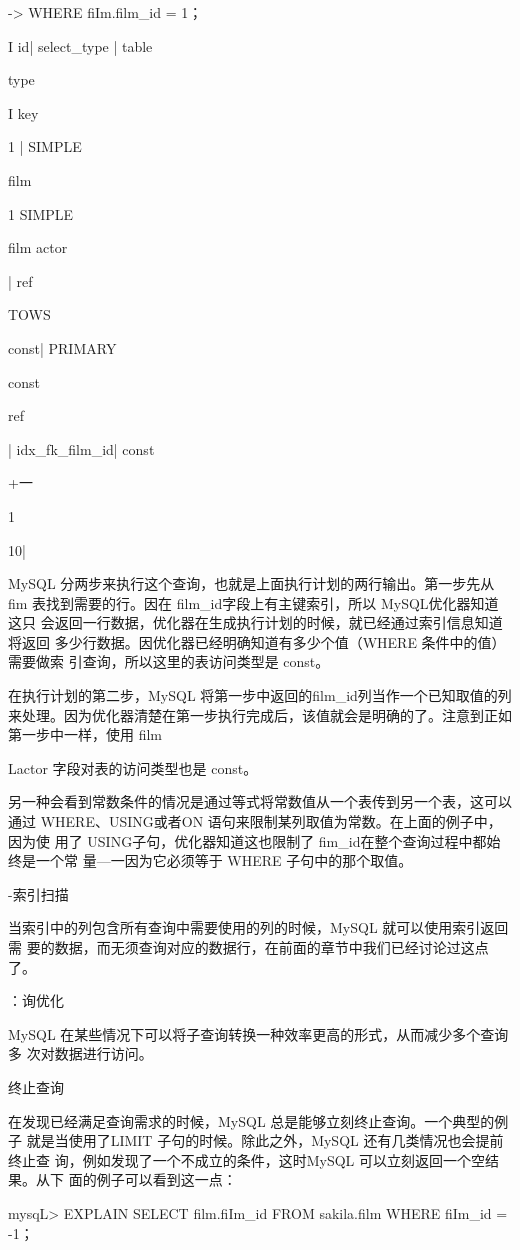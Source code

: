-> WHERE fiIm.film\_id = 1；

I id| select\_type | table

type

I key

1 | SIMPLE

film

1 SIMPLE

film actor

| ref

TOWS

const| PRIMARY

const

ref

| idx\_fk\_film\_id| const

+一

1

10|

MySQL 分两步来执行这个查询，也就是上面执行计划的两行输出。第一步先从 fim
表找到需要的行。因在 film\_id字段上有主键索引，所以 MySQL优化器知道这只
会返回一行数据，优化器在生成执行计划的时候，就已经通过索引信息知道将返回
多少行数据。因优化器已经明确知道有多少个值（WHERE 条件中的值）需要做索
引查询，所以这里的表访问类型是 const。

在执行计划的第二步，MySQL 将第一步中返回的film\_id列当作一个已知取值的列
来处理。因为优化器清楚在第一步执行完成后，该值就会是明确的了。注意到正如
第一步中一样，使用 film

Lactor 字段对表的访问类型也是 const。

另一种会看到常数条件的情况是通过等式将常数值从一个表传到另一个表，这可以
通过 WHERE、USING或者ON 语句来限制某列取值为常数。在上面的例子中，因为使
用了 USING子句，优化器知道这也限制了 fim\_id在整个查询过程中都始终是一个常
量—一因为它必须等于 WHERE 子句中的那个取值。

-索引扫描

当索引中的列包含所有查询中需要使用的列的时候，MySQL 就可以使用索引返回需
要的数据，而无须查询对应的数据行，在前面的章节中我们已经讨论过这点了。

：询优化

MySQL 在某些情况下可以将子查询转换一种效率更高的形式，从而减少多个查询多
次对数据进行访问。

终止查询

在发现已经满足查询需求的时候，MySQL 总是能够立刻终止查询。一个典型的例子
就是当使用了LIMIT 子句的时候。除此之外，MySQL 还有几类情况也会提前终止查
询，例如发现了一个不成立的条件，这时MySQL 可以立刻返回一个空结果。从下
面的例子可以看到这一点：

mysqL> EXPLAIN SELECT film.fiIm\_id FROM sakila.film WHERE fiIm\_id = -1；

